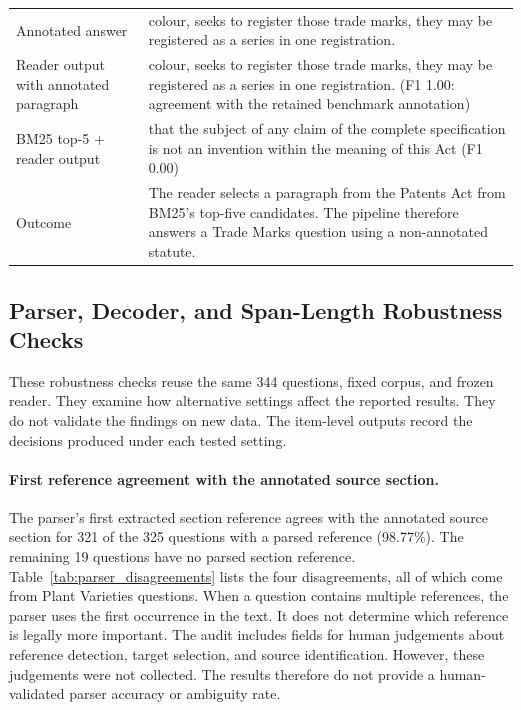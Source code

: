 \documentclass[pdflatex,sn-basic]{sn-jnl}%
\theoremstyle{thmstyleone}%
\theoremstyle{thmstyletwo}%
\theoremstyle{thmstylethree}%
\begin{document}
\begin{table}[!hb]
\begin{tabular}{@{}p{2.3cm}p{7.95cm}@{}}
        Annotated answer
        & colour, seeks to register those trade marks, they may be registered
        as a series in one registration. \\

        Reader output with annotated paragraph
        & colour, seeks to register those trade marks, they may be registered
        as a series in one registration.
        (F1 1.00: agreement with the retained benchmark annotation) \\

        BM25 top-5 + reader output
        & that the subject of any claim of the complete specification is not
        an invention within the meaning of this Act (F1 0.00) \\

        Outcome
        & The reader selects a paragraph from the Patents Act from BM25's
        top-five candidates. The pipeline therefore answers a Trade Marks
        question using a non-annotated statute. \\
        \bottomrule
    \end{tabular}
\end{table}

\FloatBarrier

\subsection{Parser, Decoder, and Span-Length Robustness Checks}
\label{app:review_checks}

These robustness checks reuse the same 344 questions, fixed corpus, and frozen
reader. They examine how alternative settings affect the reported results.
They do not validate the findings on new data. The item-level outputs record
the decisions produced under each tested setting.

\paragraph*{First reference agreement with the annotated source section.}
The parser's first extracted section reference agrees with the annotated source
section for 321 of the 325 questions with a parsed reference (98.77\%). The
remaining 19 questions have no parsed section reference.
Table~\ref{tab:parser_disagreements} lists the four disagreements, all of which
come from Plant Varieties questions. When a question contains multiple
references, the parser uses the first occurrence in the text. It does not
determine which reference is legally more important. The audit includes fields
for human judgements about reference detection, target selection, and source
identification. However, these judgements were not collected. The results
therefore do not provide a human-validated parser accuracy or ambiguity rate.
\end{document}

